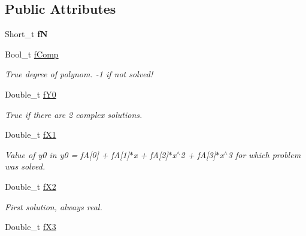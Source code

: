 \subsection*{Public Attributes}
\begin{DoxyCompactItemize}
\item 
\hypertarget{classTPoly3_afaa7abb90e0653763604ff6f4b8efc3b}{Short\-\_\-t {\bfseries f\-N}}\label{classTPoly3_afaa7abb90e0653763604ff6f4b8efc3b}

\item 
\hypertarget{classTPoly3_a3dc0d4394ef760c5072e8e6b0933331c}{Bool\-\_\-t \hyperlink{classTPoly3_a3dc0d4394ef760c5072e8e6b0933331c}{f\-Comp}}\label{classTPoly3_a3dc0d4394ef760c5072e8e6b0933331c}

\begin{DoxyCompactList}\small\item\em True degree of polynom. -\/1 if not solved! \end{DoxyCompactList}\item 
\hypertarget{classTPoly3_ac9c53f6c8af563503ca09045fc8c3ea4}{Double\-\_\-t \hyperlink{classTPoly3_ac9c53f6c8af563503ca09045fc8c3ea4}{f\-Y0}}\label{classTPoly3_ac9c53f6c8af563503ca09045fc8c3ea4}

\begin{DoxyCompactList}\small\item\em True if there are 2 complex solutions. \end{DoxyCompactList}\item 
\hypertarget{classTPoly3_aebd6dc68db307343fa743ae9b00c4cdf}{Double\-\_\-t \hyperlink{classTPoly3_aebd6dc68db307343fa743ae9b00c4cdf}{f\-X1}}\label{classTPoly3_aebd6dc68db307343fa743ae9b00c4cdf}

\begin{DoxyCompactList}\small\item\em Value of y0 in y0 = f\-A\mbox{[}0\mbox{]} + f\-A\mbox{[}1\mbox{]}$\ast$x + f\-A\mbox{[}2\mbox{]}$\ast$x$^\wedge$2 + f\-A\mbox{[}3\mbox{]}$\ast$x$^\wedge$3 for which problem was solved. \end{DoxyCompactList}\item 
\hypertarget{classTPoly3_ac41f956e14b0b71bc62772fd9ae61887}{Double\-\_\-t \hyperlink{classTPoly3_ac41f956e14b0b71bc62772fd9ae61887}{f\-X2}}\label{classTPoly3_ac41f956e14b0b71bc62772fd9ae61887}

\begin{DoxyCompactList}\small\item\em First solution, always real. \end{DoxyCompactList}\item 
\hypertarget{classTPoly3_a41354b337bbcbdda1211cf4f2669496a}{Double\-\_\-t \hyperlink{classTPoly3_a41354b337bbcbdda1211cf4f2669496a}{f\-X3}}\label{classTPoly3_a41354b337bbcbdda1211cf4f2669496a}


\end{DoxyCompactItemize}
